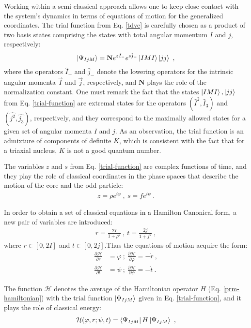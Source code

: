\documentclass[11pt]{article}
\begin{document}
Working within a semi-classical approach allows one to keep close contact with the system's dynamics in terms of equations of motion for the generalized coordinates. The trial function from Eq. \ref{tdve} is carefully chosen as a product of two basis states comprising the states with total angular momentum $I$ and $j$, respectively:
\begin{align}
    \ket{\Psi_{IjM}}=\mathbf{N}e^{z\hat{I}_-}e^{s\hat{j}_-}\ket{IMI}\ket{jj}\ ,
    \label{trial-function}
\end{align}
where the operators $\hat{I}_-$ and $\hat{j}_-$ denote the lowering operators for the intrinsic angular momenta $\vec{I}$ and $\vec{j}$, respectively, and $\mathbf{N}$ plays the role of the normalization constant. One must remark the fact that the states $\ket{IMI}, \ket{jj}$ from Eq. \ref{trial-function} are extremal states for the operators $(\hat{I}^2,\hat{I}_3)$ and $(\hat{j^2},\hat{j_3})$, respectively, and they correspond to the maximally allowed states for a given set of angular momenta $I$ and $j$. As an observation, the trial function is an admixture of components of definite $K$, which is consistent with the fact that for a triaxial nucleus, $K$ is not a good quantum number.

The variables $z$ and $s$ from Eq. \ref{trial-function} are complex functions of time, and they play the role of classical coordinates in the phase spaces that describe the motion of the core and the odd particle:
\begin{align}
    z=\rho e^{i\varphi}\ ,\ s=fe^{i\psi}\ .
    \label{complex-variable-set}
\end{align}

In order to obtain a set of classical equations in a Hamilton Canonical form, a new pair of variables are introduced: 
\begin{align}
    r=\frac{2I}{1+\rho^2}\ ,\ t=\frac{2j}{1+f^2}\ ,
\end{align}
where $r\in\left[0,2I\right]$ and $t\in\left[0,2j\right]$.Thus the equations of motion acquire the form:
\begin{align}
    \frac{\partial\mathcal{H}}{\partial r}&=\dot{\varphi}\ ;\ \frac{\partial\mathcal{H}}{\partial \varphi}=-\dot{r}\ , \nonumber\\
    \frac{\partial\mathcal{H}}{\partial t}&=\dot{\psi}\ ;\ \frac{\partial\mathcal{H}}{\partial \psi}=-\dot{t}\ .
    \label{eq-motion}
\end{align}

The function $\mathcal{H}$ denotes the average of the Hamiltonian operator $H$ (Eq. \ref{prm-hamiltonian}) with the trial function $\ket{\Psi_{IjM}}$ given in Eq. \ref{trial-function}, and it plays the role of classical energy:
\begin{align}
    \mathcal{H}(\varphi,r;\psi,t)=\bra{\Psi_{IjM}}H\ket{\Psi_{IjM}}\ ,
\end{align}
\end{document}
